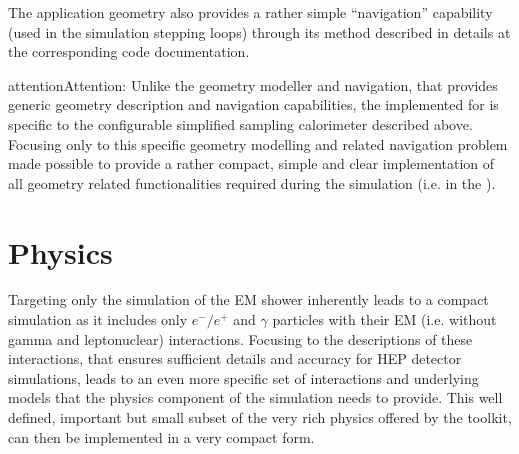 \documentclass[letterpaper,10pt,english]{sphinxmanual}
\begin{document}
\sphinxAtStartPar
The application geometry also provides a rather simple “navigation” capability (used in the simulation stepping loops) through its {\hyperref[\detokenize{Simulation/SimulationCodeDoc:_CPPv4N8Geometry22CalculateDistanceToOutEPdPdPP3BoxPiPi}]{}} method
described in details at the corresponding code documentation.

\begin{sphinxadmonition}{attention}{Attention:}
\sphinxAtStartPar
Unlike the  geometry modeller and navigation, that provides generic geometry description and navigation capabilities,
the {\hyperref[\detokenize{Simulation/SimulationCodeDoc:_CPPv48Geometry}]{}} implemented for  is specific to the configurable simplified sampling calorimeter described above. Focusing
only to this specific geometry modelling and related navigation problem made possible to provide a rather compact, simple and clear implementation
of all geometry related functionalities required during the simulation (i.e. in the {\hyperref[\detokenize{Simulation/SimulationCodeDoc:_CPPv412SteppingLoop}]{}}).
\end{sphinxadmonition}


\section{Physics}
\label{\detokenize{IntroAndInstall/components:physics}}
\sphinxAtStartPar
Targeting only the simulation of the EM shower inherently leads to a compact simulation as it includes only \(e^-/e^+\) and \(\gamma\)
particles with their EM (i.e. without gamma\sphinxhyphen{} and lepto\sphinxhyphen{}nuclear) interactions. Focusing to the descriptions of these interactions, that ensures
sufficient details and accuracy for HEP detector simulations, leads to an even more specific set of interactions and underlying models that
the physics component of the simulation needs to provide. This well defined, important but small subset of the very rich physics offered by
the  toolkit, can then be implemented in a very compact form.
\end{document}
